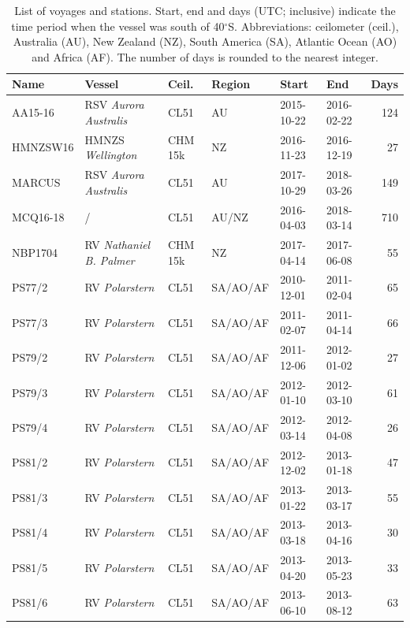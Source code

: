 \documentclass[12pt,a4paper]{article}
\begin{document}
\begin{table}
\caption{List of voyages and stations. Start, end and days (UTC; inclusive) indicate the time period when the vessel was south of 40$^\circ$S. Abbreviations: ceilometer (ceil.), Australia (AU), New Zealand (NZ), South America (SA), Atlantic Ocean (AO) and Africa (AF). The number of days is rounded to the nearest integer.}
\label{tab:voyages}
\small
\begin{tabular}{llllllr}
Name & Vessel & Ceil. & Region & Start & End & Days\\
\hline
AA15-16  & RSV \emph{Aurora Australis}   & CL51    & AU       & 2015-10-22 & 2016-02-22 & 124\\
HMNZSW16 & HMNZS \emph{Wellington}       & CHM 15k & NZ       & 2016-11-23 & 2016-12-19 & 27 \\
MARCUS   & RSV \emph{Aurora Australis}   & CL51    & AU       & 2017-10-29 & 2018-03-26 & 149\\
MCQ16-18 & /                             & CL51    & AU/NZ    & 2016-04-03 & 2018-03-14 & 710\\
NBP1704  & RV \emph{Nathaniel B. Palmer} & CHM 15k & NZ       & 2017-04-14 & 2017-06-08 & 55 \\
PS77/2   & RV \emph{Polarstern}          & CL51    & SA/AO/AF & 2010-12-01 & 2011-02-04 & 65 \\
PS77/3   & RV \emph{Polarstern}          & CL51    & SA/AO/AF & 2011-02-07 & 2011-04-14 & 66 \\
PS79/2   & RV \emph{Polarstern}          & CL51    & SA/AO/AF & 2011-12-06 & 2012-01-02 & 27 \\
PS79/3   & RV \emph{Polarstern}          & CL51    & SA/AO/AF & 2012-01-10 & 2012-03-10 & 61 \\
PS79/4   & RV \emph{Polarstern}          & CL51    & SA/AO/AF & 2012-03-14 & 2012-04-08 & 26 \\
PS81/2   & RV \emph{Polarstern}          & CL51    & SA/AO/AF & 2012-12-02 & 2013-01-18 & 47 \\
PS81/3   & RV \emph{Polarstern}          & CL51    & SA/AO/AF & 2013-01-22 & 2013-03-17 & 55 \\
PS81/4   & RV \emph{Polarstern}          & CL51    & SA/AO/AF & 2013-03-18 & 2013-04-16 & 30 \\
PS81/5   & RV \emph{Polarstern}          & CL51    & SA/AO/AF & 2013-04-20 & 2013-05-23 & 33 \\
PS81/6   & RV \emph{Polarstern}          & CL51    & SA/AO/AF & 2013-06-10 & 2013-08-12 & 63 \\

\end{tabular}
\end{table}
\end{document}
